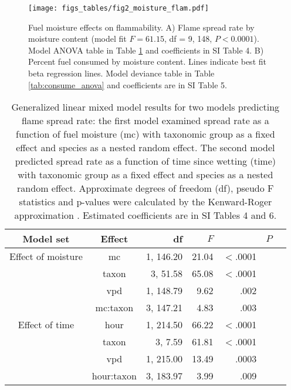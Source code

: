 \documentclass[letterpaper,12pt]{article}
\begin{document}
\begin{figure}
  \centering
\texttt{[image: figs\_tables/fig2\_moisture\_flam.pdf]}
\caption{Fuel moisture effects on flammability. A) Flame spread rate by
  moisture content (model fit $F = 61.15$, df = 9, 148, $P < 0.0001$). Model
  ANOVA table in Table \ref{tab:spreadrate_anova} and coefficients in SI Table
  4. B) Percent fuel consumed by moisture content. Lines indicate best fit beta
  regression lines. Model deviance table in Table \ref{tab:consume_anova} and
  coefficients are in SI Table 5.}
  \label{fig:flam_moist}
\end{figure}

\begin{table}
  \caption{Generalized linear mixed model results for two models predicting
    flame spread rate: the first model examined spread rate as a function of
    fuel moisture (mc) with taxonomic group as a fixed effect and species as a
    nested random effect. The second model predicted spread rate as a function
    of time since wetting (time) with taxonomic group as a fixed effect and
    species as a nested random effect. Approximate degrees of freedom (df),
    pseudo F statistics and p-values were calculated by the Kenward-Roger
    approximation \citep{Kenward_Roger-1997}. Estimated coefficients are in SI
    Tables 4 and 6.}
  \label{tab:spreadrate_anova}
  
\centering
\begin{tabular}{ccrrrrr}
  \toprule
Model set & Effect & df & $F$ & & $P$ \\
  \midrule
  Effect of moisture & mc & 1, 146.20 & 21.04 & $<$.0001 \\ 
 & taxon & 3, 51.58 & 65.08 & $<$.0001 \\ 
 & vpd & 1, 148.79 & 9.62 & .002 \\ 
 & mc:taxon & 3, 147.21 & 4.83 & .003 \\ 
   
  \midrule
  
  Effect of time & hour & 1, 214.50 & 66.22 & $<$.0001 \\ 
 &  taxon & 3, 7.59 & 61.81 & $<$.0001 \\ 
 & vpd & 1, 215.00 & 13.49 & .0003 \\ 
 & hour:taxon & 3, 183.97 & 3.99 & .009 \\ 

   \bottomrule

\end{tabular}
\end{table}
\end{document}
